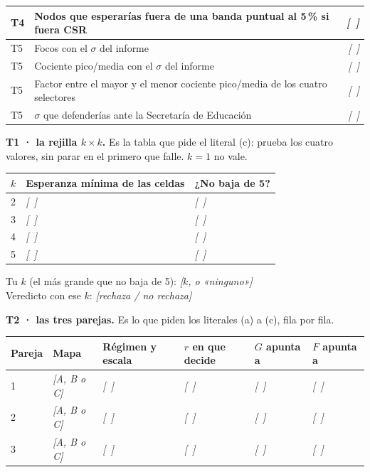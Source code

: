 \documentclass[11pt,a4paper,oneside]{article}
\newcommand{\marcador}[1]{\textcolor{grismarcador}{\textit{[#1]}}}
\begin{document}
\begin{tabularx}{\textwidth}{@{}l X r@{}}
T4 & Nodos que esperarías fuera de una banda puntual al 5\,\% si fuera CSR & \marcador{~} \\
\midrule
T5 & Focos con el $\sigma$ del informe                                    & \marcador{~} \\
T5 & Cociente pico/media con el $\sigma$ del informe                      & \marcador{~} \\
T5 & Factor entre el mayor y el menor cociente pico/media de los cuatro selectores & \marcador{~} \\
T5 & $\sigma$ que defenderías ante la Secretaría de Educación             & \marcador{~} \\
\bottomrule
\end{tabularx}
\endgroup

\vspace{0.45cm}
\noindent\textbf{T1 · la rejilla $k \times k$.} Es la tabla que pide el literal (c): prueba los cuatro
valores, sin parar en el primero que falle. $k = 1$ no vale.

\vspace{0.25cm}
\begingroup\setlength{\parskip}{0pt}
\begin{tabularx}{\textwidth}{@{}l X X@{}}
\toprule
\textbf{$k$} & \textbf{Esperanza mínima de las celdas} & \textbf{¿No baja de 5?} \\
\midrule
2 & \marcador{~} & \marcador{~} \\
3 & \marcador{~} & \marcador{~} \\
4 & \marcador{~} & \marcador{~} \\
5 & \marcador{~} & \marcador{~} \\
\bottomrule
\end{tabularx}
\endgroup

\vspace{0.15cm}
\noindent Tu $k$ (el más grande que no baja de 5): \marcador{$k$, o «ninguno»}\\
Veredicto con ese $k$: \marcador{rechaza / no rechaza}

\newpage
\noindent\textbf{T2 · las tres parejas.} Es lo que piden los literales (a) a (c), fila por fila.

\vspace{0.25cm}
\begingroup\setlength{\parskip}{0pt}
\begin{tabularx}{\textwidth}{@{}l l X l l l@{}}
\toprule
\textbf{Pareja} & \textbf{Mapa} & \textbf{Régimen y escala} & \textbf{$r$ en que decide} & \textbf{$G$ apunta a} & \textbf{$F$ apunta a} \\
\midrule
1 & \marcador{A, B o C} & \marcador{~} & \marcador{~} & \marcador{~} & \marcador{~} \\
2 & \marcador{A, B o C} & \marcador{~} & \marcador{~} & \marcador{~} & \marcador{~} \\
3 & \marcador{A, B o C} & \marcador{~} & \marcador{~} & \marcador{~} & \marcador{~} \\
\bottomrule
\end{tabularx}
\endgroup
\end{document}
